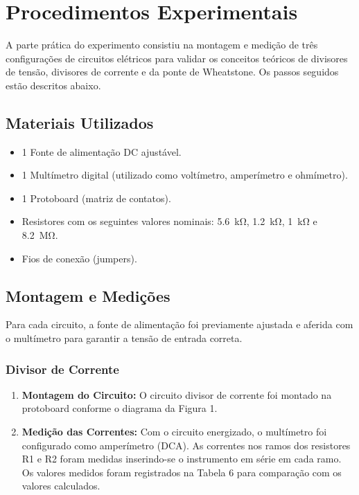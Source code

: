 \documentclass[a4paper, 12pt]{article}
\begin{document}
\section{Procedimentos Experimentais}
A parte prática do experimento consistiu na montagem e medição de três configurações de circuitos elétricos para validar os conceitos teóricos de divisores de tensão, divisores de corrente e da ponte de Wheatstone. Os passos seguidos estão descritos abaixo.

\subsection{Materiais Utilizados}
\begin{itemize}
\item 1 Fonte de alimentação DC ajustável.
\item 1 Multímetro digital (utilizado como voltímetro, amperímetro e ohmímetro).
\item 1 Protoboard (matriz de contatos).
\item Resistores com os seguintes valores nominais: \SI{5,6}{\kilo\ohm}, \SI{1,2}{\kilo\ohm}, \SI{1}{\kilo\ohm} e \SI{8,2}{\mega\ohm}.
\item Fios de conexão (jumpers).
\end{itemize}

\subsection{Montagem e Medições}
Para cada circuito, a fonte de alimentação foi previamente ajustada e aferida com o multímetro para garantir a tensão de entrada correta.

\subsubsection{Divisor de Corrente}
\begin{enumerate}
\item \textbf{Montagem do Circuito:} O circuito divisor de corrente foi montado na protoboard conforme o diagrama da Figura 1.

\item \textbf{Medição das Correntes:} Com o circuito energizado, o multímetro foi configurado como amperímetro (DCA). As correntes nos ramos dos resistores R1 e R2 foram medidas inserindo-se o instrumento em série em cada ramo. Os valores medidos foram registrados na Tabela 6 para comparação com os valores calculados.
\end{enumerate}
\end{document}
